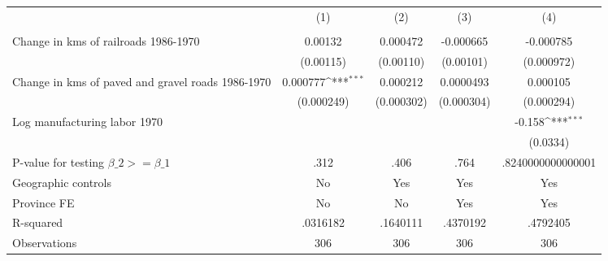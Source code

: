 {
\def\sym#1{\ifmmode^{#1}\else\(^{#1}\)\fi}
\begin{tabular}{l*{4}{c}}
\hline\hline
                &\multicolumn{1}{c}{(1)}&\multicolumn{1}{c}{(2)}&\multicolumn{1}{c}{(3)}&\multicolumn{1}{c}{(4)}\\
                &\multicolumn{1}{c}{}&\multicolumn{1}{c}{}&\multicolumn{1}{c}{}&\multicolumn{1}{c}{}\\
\hline
Change in kms of railroads 1986-1970&  0.00132         & 0.000472         &-0.000665         &-0.000785         \\
                &(0.00115)         &(0.00110)         &(0.00101)         &(0.000972)         \\
[1em]
Change in kms of paved and gravel roads 1986-1970& 0.000777\sym{***}& 0.000212         &0.0000493         & 0.000105         \\
                &(0.000249)         &(0.000302)         &(0.000304)         &(0.000294)         \\
[1em]
Log manufacturing labor 1970&                  &                  &                  &   -0.158\sym{***}\\
                &                  &                  &                  & (0.0334)         \\
\hline
P-value for testing $\beta\_{2} >= \beta\_{1}$&     .312         &     .406         &     .764         &.8240000000000001         \\
Geographic controls&       No         &      Yes         &      Yes         &      Yes         \\
Province FE     &       No         &       No         &      Yes         &      Yes         \\
R-squared       & .0316182         & .1640111         & .4370192         & .4792405         \\
Observations    &      306         &      306         &      306         &      306         \\
\hline\hline
\end{tabular}
}
